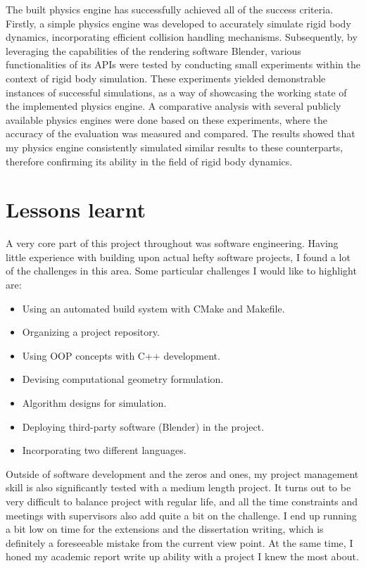 \documentclass[12pt,a4paper,twoside,openright]{report}
\begin{document}
The built physics engine has successfully achieved all of the success criteria. Firstly, a simple physics engine was developed to accurately simulate rigid body dynamics, incorporating efficient collision handling mechanisms. Subsequently, by leveraging the capabilities of the rendering software Blender, various functionalities of its APIs were tested by conducting small experiments within the context of rigid body simulation. These experiments yielded demonstrable instances of successful simulations, as a way of showcasing the working state of the implemented physics engine. A comparative analysis with several publicly available physics engines were done based on these experiments, where the accuracy of the evaluation was measured and compared. The results showed that my physics engine consistently simulated similar results to these counterparts, therefore confirming its ability in the field of rigid body dynamics.

\section{Lessons learnt}

A very core part of this project throughout was software engineering. Having little experience with building upon actual hefty software projects, I found a lot of the challenges in this area. Some particular challenges I would like to highlight are:
\begin{itemize}
\item Using an automated build system with CMake and Makefile.
\item Organizing a project repository.
\item Using OOP concepts with C++ development.
\item Devising computational geometry formulation.
\item Algorithm designs for simulation.
\item Deploying third-party software (Blender) in the project.
\item Incorporating two different languages.
\end{itemize}

Outside of software development and the zeros and ones, my project management skill is also significantly tested with a medium length project. It turns out to be very difficult to balance project with regular life, and all the time constraints and meetings with supervisors also add quite a bit on the challenge. I end up running a bit low on time for the extensions and the dissertation writing, which is definitely a foreseeable mistake from the current view point. At the same time, I honed my academic report write up ability with a project I knew the most about.
\end{document}
